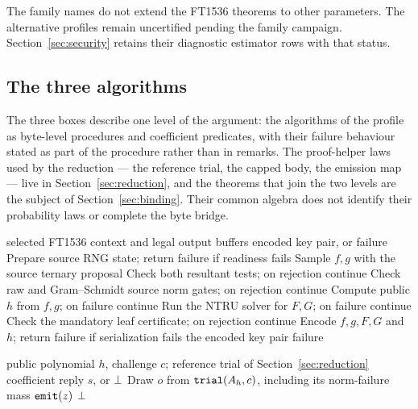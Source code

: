 The family names do not extend the FT1536 theorems to other parameters.
The alternative profiles remain uncertified pending the family campaign.
Section~\ref{sec:security} retains their diagnostic estimator rows with
that status.

\subsection{The three algorithms}
The three boxes describe one level of the argument: the algorithms of
the profile as byte-level procedures and coefficient predicates, with
their failure behaviour stated as part of the procedure rather than in
remarks. The proof-helper laws used by the reduction --- the reference
trial, the capped body, the emission map --- live in
Section~\ref{sec:reduction}, and the theorems that join the two levels
are the subject of Section~\ref{sec:binding}. Their common algebra does
not identify their probability laws or complete the byte bridge.

\begin{algorithm}[!htbp]
\caption{FT1536 KeyGen: source-control synopsis}\label{alg:keygen}
\begin{algorithmic}[1]
\Require selected FT1536 context and legal output buffers
\Ensure encoded key pair, or failure
\State Prepare source RNG state; return failure if readiness fails
  \State Sample $f,g$ with the source ternary proposal
  \State Check both resultant tests; on rejection continue
  \State Check raw and Gram--Schmidt source norm gates; on rejection continue
  \State Compute public $h$ from $f,g$; on failure continue
  \State Run the NTRU solver for $F,G$; on failure continue
  \State Check the mandatory leaf certificate; on rejection continue
  \State Encode $f,g,F,G$ and $h$; return failure if serialization fails
  \State \Return the encoded key pair
\EndFor
\State \Return failure
\end{algorithmic}
\end{algorithm}

\begin{algorithm}[!htbp]
\caption{FT1536 Sign: reference body at a fixed challenge}\label{alg:sign}
\begin{algorithmic}[1]
\Require public polynomial $h$, challenge $c$; reference trial of Section~\ref{sec:reduction}
\Ensure coefficient reply $s$, or $\bot$
  \State Draw $o$ from $\code{trial}(A_h,c)$, including its norm-failure mass
    \State \Return $\code{emit}(z)$ 
  \EndIf
\EndFor
\State \Return $\bot$ 
\end{algorithmic}
\end{algorithm}

